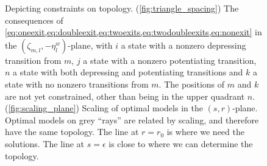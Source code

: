 \documentclass[12pt]{article}
\newcommand{\etwm}{\eta^w}
\newcommand{\dgnm}{\zeta}
\begin{document}
\begin{figure}[ht]
\begin{center}
\begin{myenuma}
  \item \label{fig:triangle_spacing} 
  \hspace{0.2em}
  \item \label{fig:scaling_plane}
\end{myenuma}
\caption[Depicting constraints on topology]{Depicting constraints on topology.
(\ref*{fig:triangle_spacing}) The consequences of \cref{eq:oneexit,eq:doubleexit,eq:twoexits,eq:twodoubleexits,eq:nonexit} in the \( (\dgnm_{m,l},-\etwm_l) \)-plane, 
  with \(i\) a state with a nonzero depressing transition from \(m\), 
  \(j\) a state with a nonzero potentiating transition, 
  \(n\) a state with both depressing and potentiating transitions 
  and \(k\) a state with no nonzero transitions from \(m\).
  The positions of \(m\) and \(k\) are not yet constrained, other than being in the upper quadrant \wrt \(n\).
(\ref*{fig:scaling_plane}) Scaling of optimal models in the \((s,r)\)-plane.
  Optimal models on grey ``rays'' are related by scaling, and therefore have the same topology.
  The line at \(r = r_0\) is where we need the solutions.
  The line at \(s = \epsilon\) is close to where we can determine the topology.
\label{fig:planes}}
\end{center}
\end{figure}
\end{document}
